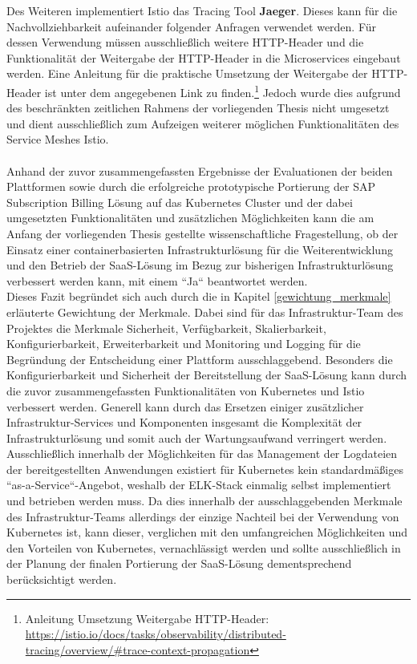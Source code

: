 Des Weiteren implementiert Istio das Tracing Tool \textbf{Jaeger}. Dieses kann für die Nachvollziehbarkeit aufeinander folgender Anfragen verwendet werden. Für dessen Verwendung müssen ausschließlich weitere \ac{HTTP}-Header und die Funktionalität der Weitergabe der \ac{HTTP}-Header in die Microservices eingebaut werden. Eine Anleitung für die praktische Umsetzung der Weitergabe der \ac{HTTP}-Header ist unter dem angegebenen Link zu finden.\footnote{Anleitung Umsetzung Weitergabe \ac{HTTP}-Header: \url{https://istio.io/docs/tasks/observability/distributed-tracing/overview/\#trace-context-propagation}} Jedoch wurde dies aufgrund des beschränkten zeitlichen Rahmens der vorliegenden Thesis nicht umgesetzt und dient ausschließlich zum Aufzeigen weiterer möglichen Funktionalitäten des Service Meshes Istio.\\
\\
Anhand der zuvor zusammengefassten Ergebnisse der Evaluationen der beiden Plattformen sowie durch die erfolgreiche prototypische Portierung der SAP Subscription Billing Lösung auf das Kubernetes Cluster und der dabei umgesetzten Funktionalitäten und zusätzlichen Möglichkeiten kann die am Anfang der vorliegenden Thesis gestellte wissenschaftliche Fragestellung, ob der Einsatz einer containerbasierten Infrastrukturlösung für die Weiterentwicklung und den Betrieb der \ac{SaaS}-Lösung im Bezug zur bisherigen Infrastrukturlösung verbessert werden kann, mit einem ``Ja`` beantwortet werden.\\ 
Dieses Fazit begründet sich auch durch die in Kapitel \ref{gewichtung_merkmale} erläuterte Gewichtung der Merkmale. Dabei sind für das Infrastruktur-Team des Projektes die Merkmale Sicherheit, Verfügbarkeit, Skalierbarkeit, Konfigurierbarkeit, Erweiterbarkeit und Monitoring und Logging für die Begründung der Entscheidung einer Plattform ausschlaggebend. Besonders die Konfigurierbarkeit und Sicherheit der Bereitstellung der \ac{SaaS}-Lösung kann durch die zuvor zusammengefassten Funktionalitäten von Kubernetes und Istio verbessert werden. Generell kann durch das Ersetzen einiger zusätzlicher Infrastruktur-Services und Komponenten insgesamt die Komplexität der Infrastrukturlösung und somit auch der Wartungsaufwand verringert werden.\\ 
Ausschließlich innerhalb der Möglichkeiten für das Management der Logdateien der bereitgestellten Anwendungen existiert für Kubernetes kein standardmäßiges ``as-a-Service``-Angebot, weshalb der ELK-Stack einmalig selbst implementiert und betrieben werden muss. Da dies innerhalb der ausschlaggebenden Merkmale des Infrastruktur-Teams allerdings der einzige Nachteil bei der Verwendung von Kubernetes ist, kann dieser, verglichen mit den umfangreichen Möglichkeiten und den Vorteilen von Kubernetes, vernachlässigt werden und sollte ausschließlich in der Planung der finalen Portierung der \ac{SaaS}-Lösung dementsprechend berücksichtigt werden.\\
